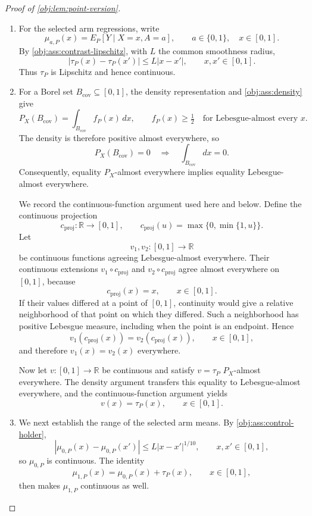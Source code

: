 \begin{proof}[Proof of \cref{obj:lem:point-version}]
\begin{enumerate}
\item For the selected arm regressions, write
\[
\mu_{a,P}(x)=E_P[Y\mid X=x,A=a],
\qquad a\in\{0,1\},\quad x\in[0,1].
\]
By \cref{obj:ass:contrast-lipschitz}, with \(L\) the common smoothness radius,
\[
|\tau_P(x)-\tau_P(x')|\le L|x-x'|,
\qquad x,x'\in[0,1].
\]
Thus \(\tau_P\) is Lipschitz and hence continuous. %

\item For a Borel set \(B_{\mathrm{cov}}\subseteq[0,1]\), the density representation and \cref{obj:ass:density} give
\[
P_X(B_{\mathrm{cov}})
=\int_{B_{\mathrm{cov}}}f_P(x)\,dx,
\qquad
f_P(x)\ge\tfrac12
\quad\text{for Lebesgue-almost every }x.
\]
The density is therefore positive almost everywhere, so
\[
P_X(B_{\mathrm{cov}})=0
\quad\Longrightarrow\quad
\int_{B_{\mathrm{cov}}}dx=0.
\]
Consequently, equality \(P_X\)-almost everywhere implies equality Lebesgue-almost everywhere.

We record the continuous-function argument used here and below. Define the continuous projection
\[
c_{\mathrm{proj}}:\mathbb R\longrightarrow[0,1],
\qquad
c_{\mathrm{proj}}(u)=\max\{0,\min\{1,u\}\}.
\]
Let
\[
v_1,v_2:[0,1]\longrightarrow\mathbb R
\]
be continuous functions agreeing Lebesgue-almost everywhere. Their continuous extensions \(v_1\circ c_{\mathrm{proj}}\) and \(v_2\circ c_{\mathrm{proj}}\) agree almost everywhere on \([0,1]\), because
\[
c_{\mathrm{proj}}(x)=x,\qquad x\in[0,1].
\]
If their values differed at a point of \([0,1]\), continuity would give a relative neighborhood of that point on which they differed. Such a neighborhood has positive Lebesgue measure, including when the point is an endpoint. Hence
\[
v_1(c_{\mathrm{proj}}(x))
=v_2(c_{\mathrm{proj}}(x)),
\qquad x\in[0,1],
\]
and therefore \(v_1(x)=v_2(x)\) everywhere.

Now let \(v:[0,1]\to\mathbb R\) be continuous and satisfy \(v=\tau_P\) \(P_X\)-almost everywhere. The density argument transfers this equality to Lebesgue-almost everywhere, and the continuous-function argument yields
\[
v(x)=\tau_P(x),\qquad x\in[0,1].
\] %

\item We next establish the range of the selected arm means. By \cref{obj:ass:control-holder},
\[
|\mu_{0,P}(x)-\mu_{0,P}(x')|
\le L|x-x'|^{1/10},
\qquad x,x'\in[0,1],
\]
so \(\mu_{0,P}\) is continuous. The identity
\[
\mu_{1,P}(x)=\mu_{0,P}(x)+\tau_P(x),
\qquad x\in[0,1],
\]
then makes \(\mu_{1,P}\) continuous as well.


\end{enumerate}
\end{proof}

